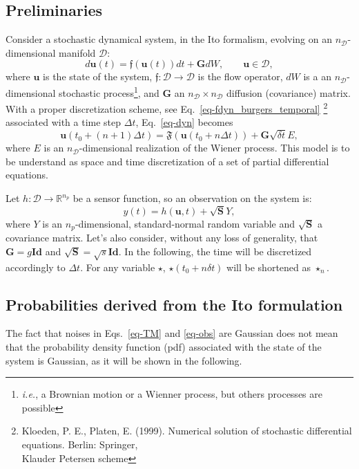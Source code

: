 \documentclass[10pt,openany,onecolumn,a4wide,pof]{article}
\newcommand{\gras}[1]{\boldsymbol{#1}}
\newcommand{\mypar}[1]{\left(#1\right)}
\newcommand{\Ephaz}{\mathcal{D}}%
\newcommand{\Nphaz}{n_{\mathcal{D}}} %
\newcommand{\Nm}{n_p} %
\newcommand{\flot}{\mathfrak{f}} %
\newcommand{\fint}{\mathfrak{F}} %
\newcommand{\obs}{y} %
\newcommand{\point}{\gras{u}} %
\begin{document}
\subsection{Preliminaries}
Consider a stochastic dynamical system, in the Ito formalism, evolving on an $\Nphaz$-dimensional manifold $\Ephaz$:
\begin{equation}
d \point\mypar{t} = \flot\mypar{\point\mypar{t}}dt + \gras{G}dW, \qquad \point \in \Ephaz,
\label{eq-dyn}
\end{equation}
where $\point$ is the state of the system, $\flot:\Ephaz \rightarrow \Ephaz$
is the flow operator, $dW$ is a an $\Nphaz$-dimensional stochastic process\footnote{\emph{i.e.}, a Brownian motion or a Wienner process, but others processes are possible}, and $\gras{G}$ an $\Nphaz\times \Nphaz$ diffusion (covariance) matrix.
With a proper discretization scheme, see Eq.~\eqref{eq-fdyn_burgers_temporal} \footnote{Kloeden, P. E., Platen, E. (1999).
  Numerical solution of stochastic differential equations. Berlin:
  Springer,\\ Klauder Petersen scheme} associated with a time step $\Delta t$, Eq.~\eqref{eq-dyn} becomes
\begin{equation}
\point\mypar{t_0+\mypar{n+1}\Delta t} =  \fint\mypar{\point\mypar{t_0+n\Delta t}}+\gras{G}\sqrt{\delta t} E,
\label{eq-TM}
\end{equation}
where $E$ is an $\Nphaz$-dimensional realization of the Wiener process. 
This model is to be understand as space and time discretization of a set of partial differential equations.

Let $h:\Ephaz \rightarrow \mathbb{R}^{\Nm}$ be a sensor function, so an observation on the system is:
\begin{equation}
 \obs(t) = h\mypar{\point,t} + \sqrt{\gras{S}}Y,
\label{eq-obs}
\end{equation}
where $Y$ is an $\Nm$-dimensional, standard-normal random variable and
$\sqrt{\gras{S}}$ a covariance matrix. Let's also consider, without any loss
of generality, that $\gras{G} = g \gras{Id}$ and
$\sqrt{\gras{S}} = \sqrt{s} \gras{Id}$. In the following, the time will be
discretized accordingly to $\Delta t$. For any variable $\star$,
$ \star\mypar{t_0+n\delta t}$ will be shortened as $ \star_n$.


\subsection{Probabilities derived from the Ito formulation}
The fact that noises in Eqs.~\eqref{eq-TM} and \eqref{eq-obs} are Gaussian does not mean that the probability density function (pdf) associated with the state of the system is Gaussian, as it will be shown in the following.
\end{document}
